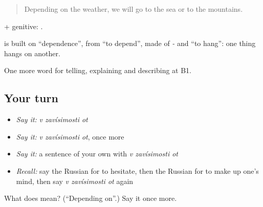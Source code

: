 \begin{quote}
Depending on the weather, we will go to the sea or to the mountains.
\end{quote}

\emph{} + genitive: \emph{   }.

\begin{cousinweb}
\textbf{  } is built on \emph{} \textquotedblleft{}dependence\textquotedblright{}, from \emph{} \textquotedblleft{}to depend\textquotedblright{}, made of \emph{-} and \emph{} \textquotedblleft{}to hang\textquotedblright{}: one thing hangs on another.
\end{cousinweb}

\begin{grammarlens}[title={What you've built}]
One more word for telling, explaining and describing at B1.
\end{grammarlens}

\subsection*{Your turn}
\begin{itemize}
\raggedright
  \item \emph{Say it:} \emph{v zavísimosti ot}
  \item \emph{Say it:} \emph{v zavísimosti ot}, once more
  \item \emph{Say it:} a sentence of your own with \emph{v zavísimosti ot}
  \item \emph{Recall:} say the Russian for to hesitate, then the Russian for to make up one’s mind, then say \emph{v zavísimosti ot} again
\end{itemize}

\begin{tcolorbox}[breakable,colback=teal!4,colframe=teal!35!black,title={Before you move on}]
What does    mean? (\textquotedblleft{}Depending on\textquotedblright{}.) Say it once more.
\end{tcolorbox}

